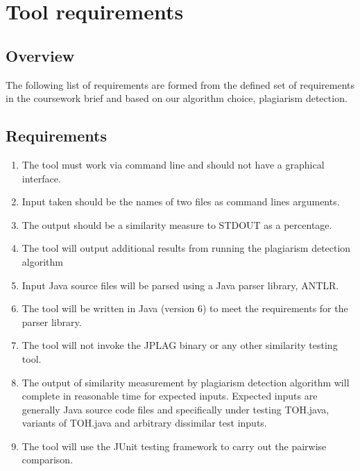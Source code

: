 \section{Tool requirements}

\subsection{Overview}
The following list of requirements are formed from the defined set of requirements in the coursework brief and based on our algorithm choice, plagiarism detection.
\subsection{Requirements}
\begin{enumerate}
\item The tool must work via command line and should not have a graphical interface.

\item Input taken should be the names of two files as command lines arguments.

\item The output should be a similarity measure to STDOUT as a percentage.

\item The tool will output additional results from running the plagiarism detection algorithm

\item Input Java source files will be parsed using a Java parser library, ANTLR.

\item The tool will be written in Java (version 6) to meet the requirements for the parser library.

\item The tool will not invoke the JPLAG binary or any other similarity testing tool.

\item The output of similarity measurement by plagiarism detection algorithm will complete in reasonable time for expected inputs. Expected inputs are generally Java source code files and specifically under testing TOH.java, variants of TOH.java and arbitrary dissimilar test inputs.

\item The tool will use the JUnit testing framework to carry out the pairwise comparison.

\end{enumerate}
\break
